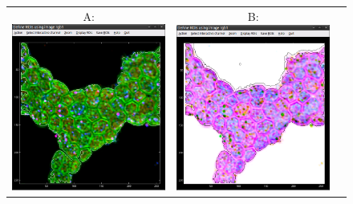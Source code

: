 \begin{figure}[!ht]
\centering
\begin{tabular}{ccc}
A: \includegraphics[scale=0.19]{figs3/LANS-roi-interactive6}
&
B: \includegraphics[scale=0.19]{figs3/LANS-roi-interactive7}

\end{tabular}
\end{figure}
